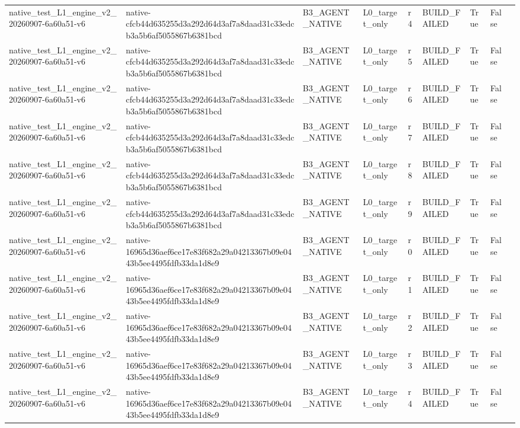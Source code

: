 \begin{tabular}{lllllllll}
native\_test\_L1\_engine\_v2\_20260907-6a60a51-v6 & native-cfcb44d635255d3a292d64d3af7a8daad31c33edcb3a5b6af5055867b6381bcd & B3\_AGENT\_NATIVE & L0\_target\_only & r4 & BUILD\_FAILED & True & False &  \\
native\_test\_L1\_engine\_v2\_20260907-6a60a51-v6 & native-cfcb44d635255d3a292d64d3af7a8daad31c33edcb3a5b6af5055867b6381bcd & B3\_AGENT\_NATIVE & L0\_target\_only & r5 & BUILD\_FAILED & True & False &  \\
native\_test\_L1\_engine\_v2\_20260907-6a60a51-v6 & native-cfcb44d635255d3a292d64d3af7a8daad31c33edcb3a5b6af5055867b6381bcd & B3\_AGENT\_NATIVE & L0\_target\_only & r6 & BUILD\_FAILED & True & False &  \\
native\_test\_L1\_engine\_v2\_20260907-6a60a51-v6 & native-cfcb44d635255d3a292d64d3af7a8daad31c33edcb3a5b6af5055867b6381bcd & B3\_AGENT\_NATIVE & L0\_target\_only & r7 & BUILD\_FAILED & True & False &  \\
native\_test\_L1\_engine\_v2\_20260907-6a60a51-v6 & native-cfcb44d635255d3a292d64d3af7a8daad31c33edcb3a5b6af5055867b6381bcd & B3\_AGENT\_NATIVE & L0\_target\_only & r8 & BUILD\_FAILED & True & False &  \\
native\_test\_L1\_engine\_v2\_20260907-6a60a51-v6 & native-cfcb44d635255d3a292d64d3af7a8daad31c33edcb3a5b6af5055867b6381bcd & B3\_AGENT\_NATIVE & L0\_target\_only & r9 & BUILD\_FAILED & True & False &  \\
native\_test\_L1\_engine\_v2\_20260907-6a60a51-v6 & native-16965d36aef6ce17e83f682a29a04213367b09e0443b5ee4495fdfb33da1d8e9 & B3\_AGENT\_NATIVE & L0\_target\_only & r0 & BUILD\_FAILED & True & False &  \\
native\_test\_L1\_engine\_v2\_20260907-6a60a51-v6 & native-16965d36aef6ce17e83f682a29a04213367b09e0443b5ee4495fdfb33da1d8e9 & B3\_AGENT\_NATIVE & L0\_target\_only & r1 & BUILD\_FAILED & True & False &  \\
native\_test\_L1\_engine\_v2\_20260907-6a60a51-v6 & native-16965d36aef6ce17e83f682a29a04213367b09e0443b5ee4495fdfb33da1d8e9 & B3\_AGENT\_NATIVE & L0\_target\_only & r2 & BUILD\_FAILED & True & False &  \\
native\_test\_L1\_engine\_v2\_20260907-6a60a51-v6 & native-16965d36aef6ce17e83f682a29a04213367b09e0443b5ee4495fdfb33da1d8e9 & B3\_AGENT\_NATIVE & L0\_target\_only & r3 & BUILD\_FAILED & True & False &  \\
native\_test\_L1\_engine\_v2\_20260907-6a60a51-v6 & native-16965d36aef6ce17e83f682a29a04213367b09e0443b5ee4495fdfb33da1d8e9 & B3\_AGENT\_NATIVE & L0\_target\_only & r4 & BUILD\_FAILED & True & False &  \\

\end{tabular}

